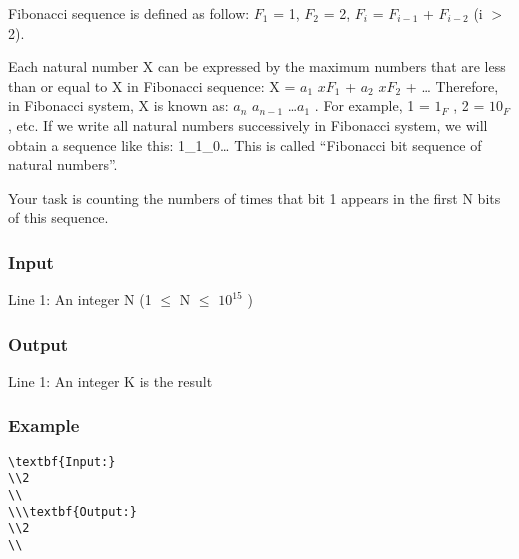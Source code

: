 



   Fibonacci sequence is defined as follow: $F_{1}$   = 1, $F_{2}$   = 2, $F_{i}$   = $F_{i-1}$   + $F_{i-2}$   (i $>$ 2).  

   Each natural number X can be expressed by the maximum numbers that are less than or equal to X in Fibonacci sequence: X = $a_{1}$   $xF_{1}$   + $a_{2}$   $xF_{2}$   + … Therefore, in Fibonacci system, X is known as: $a_{n}$   $a_{n-1}$   …$a_{1}$   . For example, 1 = $1_{F}$   , 2 = $10_{F}$   , etc. If we write all natural numbers successively in Fibonacci system, we will obtain a sequence like this: 1\_1\_0… This is called “Fibonacci bit sequence of natural numbers”.  

   Your task is counting the numbers of times that bit 1 appears in the first N bits of this sequence.  

\subsubsection{   Input  }

   Line 1: An integer N (1  $\le$  N  $\le$  $10^{15}$   )  

\subsubsection{   Output  }

   Line 1: An integer K is the result  

\subsubsection{   Example  }
\begin{verbatim}
\textbf{Input:}
\\2
\\
\\\textbf{Output:}
\\2
\\\end{verbatim}
